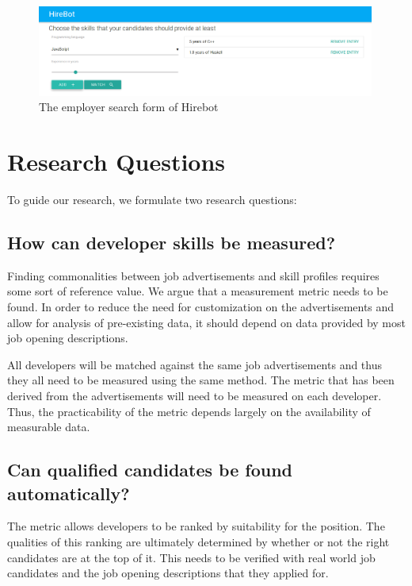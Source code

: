 \begin{figure}
  \includegraphics[width=30em]{gfx/employerview.png}
  \caption{The employer search form of Hirebot}
  \label{fig:employerview}
\end{figure}

\section{Research Questions}\label{sec:research-questions}
To guide our research, we formulate two research questions:

\subsection{How can developer skills be measured?}\label{subsec:dev-skill-measurement}
Finding commonalities between job advertisements and skill profiles
requires some sort of reference value. We argue that a measurement
metric needs to be found.
In order to reduce the need for customization
on the advertisements and allow for  analysis of pre-existing data,
it should depend on data provided by most job opening descriptions.
\newline

All developers will be matched against the same job advertisements and thus they all need to be measured using the same method. The metric that has been derived from the advertisements will need to be measured on each developer. Thus, the practicability of the metric depends largely on the availability of measurable data.

\subsection{Can qualified candidates be found automatically?}\label{subsec:measurement-quality}
The metric allows developers to be ranked by suitability for the position. The qualities of this ranking are ultimately determined by whether or not the right candidates are at the top of it. This needs to be verified with real world job candidates and the job opening descriptions that they applied for.

